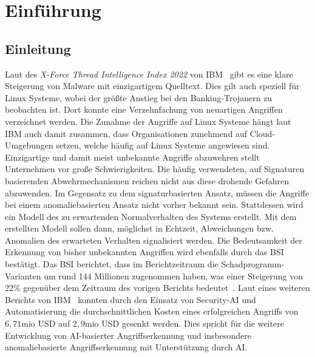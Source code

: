 \chapter{Einführung}\label{ch:introduction} %
\section{Einleitung}\label{sec:einleitung}
Laut des \textit{X-Force Thread Intelligence Index 2022} von IBM~\cite{IBM} gibt es eine klare Steigerung von Malware mit einzigartigem Quelltext.
Dies gilt auch speziell für Linux Systeme, wobei der größte Anstieg bei den Banking-Trojanern zu beobachten ist.
Dort konnte eine Verzehnfachung von neuartigen Angriffen verzeichnet werden.
Die Zunahme der Angriffe auf Linux Systeme hängt laut IBM auch damit zusammen, dass Organisationen zunehmend auf Cloud-Umgebungen setzen, welche häufig auf Linux Systeme angewiesen sind.
Einzigartige und damit meist unbekannte Angriffe abzuwehren stellt Unternehmen vor große Schwierigkeiten.
Die häufig verwendeten, auf Signaturen basierenden Abwehrmechanismen reichen nicht aus diese drohende Gefahren abzuwenden.
Im Gegensatz zu dem signaturbasierten Ansatz, müssen die Angriffe bei einem anomaliebasierten Ansatz nicht vorher bekannt sein.
Stattdessen wird ein Modell des zu erwartenden Normalverhalten des Systems erstellt.
Mit dem erstellten Modell sollen dann, möglichst in Echtzeit, Abweichungen bzw. Anomalien des erwarteten Verhalten signalisiert werden.
Die Bedeutsamkeit der Erkennung von bisher unbekannten Angriffen wird ebenfalls durch das \ac{BSI} bestätigt.
Das \ac{BSI} berichtet, dass im Berichtzeitraum die Schadprogramm-Varianten um rund 144 Millionen zugenommen haben, was einer Steigerung von 22\% gegenüber dem Zeitraum des vorigen Berichts bedeutet~\cite{BSI}.
Laut eines weiteren Berichts von IBM~\cite{IBM2} konnten durch den Einsatz von Security-\ac{AI} und Automatisierung die durchschnittlichen Kosten eines erfolgreichen Angriffs von $6,71$mio USD auf $2,9$mio USD gesenkt werden.
Dies spricht für die weitere Entwicklung von \ac{AI}-basierter Angriffserkennung und insbesondere anomaliebasierte Angriffserkennung mit Unterstützung durch \ac{AI}.

